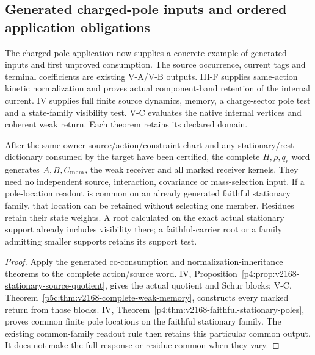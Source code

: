 \documentclass[12pt,a4paper]{article}
\begin{document}
\subsection{Generated charged-pole inputs and ordered application obligations}
\label{p2a:sec:v2168-charged-pole-inputs}
The charged-pole application now supplies a concrete example of
generated inputs and first unproved consumption. The source occurrence,
current tags and terminal coefficients are existing V-A/V-B outputs.
III-F supplies same-action kinetic normalization and proves actual
component-band retention of the internal current. IV supplies full finite
source dynamics, memory, a charge-sector pole test and a state-family
visibility test. V-C evaluates the native internal vertices and coherent
weak return. Each theorem retains its declared domain.

\begin{corollary}
\label{p2a:cor:v2168-charged-pole-input-reuse}
After the same-owner source/action/constraint chart and any stationary/rest
dictionary consumed by the target have been certified, the complete
$H,\rho,q_r$ word generates $A,B,C_{\rm mem}$, the weak receiver and all
marked receiver kernels. They need no independent source, interaction,
covariance or mass-selection input. If a pole-location readout is common
on an already generated faithful stationary family, that location can be
retained without selecting one member. Residues retain their state weights. A root calculated on the exact actual
stationary support already includes visibility there; a faithful-carrier
root or a family admitting smaller supports retains its support test.
\end{corollary}
\begin{proof}
Apply the generated co-consumption and normalization-inheritance theorems
to the complete action/source word. IV,
Proposition~\ref{p4:prop:v2168-stationary-source-quotient}, gives the actual
quotient and Schur blocks; V-C,
Theorem~\ref{p5c:thm:v2168-complete-weak-memory}, constructs every marked
return from those blocks. IV,
Theorem~\ref{p4:thm:v2168-faithful-stationary-poles}, proves common
finite pole locations on the faithful stationary family. The existing
common-family readout rule then retains this particular common output.
It does not make the full response or residue common when they vary.
\end{proof}
\end{document}
